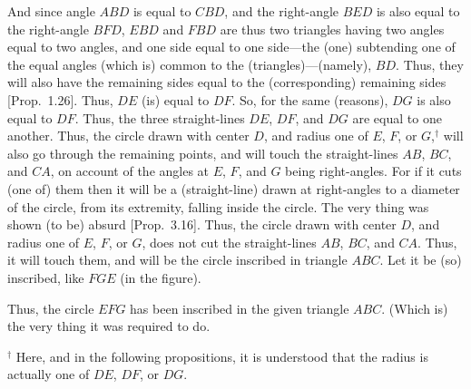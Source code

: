 \begin{Parallel}{}{}
{And since angle $ABD$ is equal to $CBD$, and the right-angle
$BED$ is also equal to the right-angle $BFD$, $EBD$ and $FBD$ are thus two triangles
having two angles equal to two angles, and one side equal to one side---the
(one) subtending one of the equal angles (which is) common to the (triangles)---(namely), $BD$. Thus, they will also have the 
remaining sides equal to the (corresponding) remaining sides [Prop.~1.26]. Thus, $DE$ (is)
equal to $DF$. So, for the same (reasons), $DG$ is also equal
to $DF$. Thus, the three straight-lines $DE$, $DF$, and $DG$ are equal to one another.
Thus, the circle drawn with center $D$, and radius one of $E$, $F$, or $G$,$^\dag$ will also
go through the remaining points, and will  touch the straight-lines $AB$, $BC$, and $CA$, on account of the angles at $E$, $F$, and $G$ being right-angles. For if it cuts (one of) them then it will be a (straight-line)
drawn at right-angles to a diameter of the circle, from its extremity, falling inside
the circle. The very thing was shown (to be) absurd [Prop.~3.16].
Thus, the circle drawn with center $D$, and radius one of $E$, $F$, or $G$,
does not cut the straight-lines $AB$, $BC$, and $CA$. Thus, it will
touch them, and will be the circle inscribed  in triangle $ABC$.
Let it be (so) inscribed, like $FGE$ (in the figure).

Thus, the circle $EFG$ has been inscribed in the given triangle $ABC$.
(Which is) the very thing it was required to do.}
\end{Parallel}
{\footnotesize \noindent$^\dag$ Here, and in the following propositions, it
is understood that the radius is actually one of $DE$, $DF$, or $DG$.}

